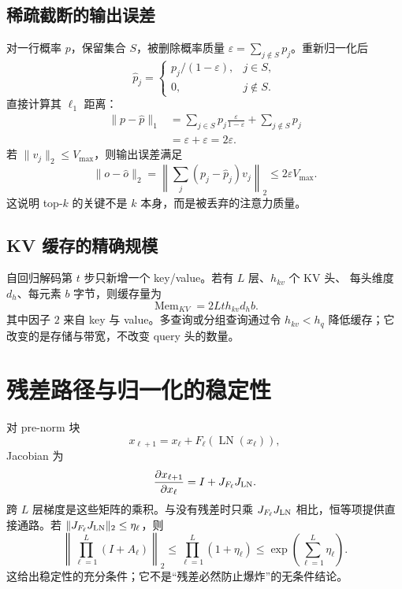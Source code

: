 \documentclass[11pt]{article}
\numberwithin{equation}{section}
\newcommand{\1}{\mathbf{1}}
\begin{document}
\subsection{稀疏截断的输出误差}

对一行概率 $p$，保留集合 $S$，被删除概率质量
$\varepsilon=\sum_{j\notin S}p_j$。重新归一化后
\begin{equation}
 \widehat p_j=
 \begin{cases}
 p_j/(1-\varepsilon),&j\in S,\\
 0,&j\notin S.
 \end{cases}
\end{equation}
直接计算其 $\ell_1$ 距离：
\begin{align}
 \|p-\widehat p\|_1
 &=\sum_{j\in S}p_j\frac{\varepsilon}{1-\varepsilon}
   +\sum_{j\notin S}p_j\\
 &=\varepsilon+\varepsilon=2\varepsilon.
\end{align}
若 $\|v_j\|_2\le V_{\max}$，则输出误差满足
\begin{equation}
 \|o-\widehat o\|_2
 =\left\|\sum_j(p_j-\widehat p_j)v_j\right\|_2
 \le 2\varepsilon V_{\max}.
\end{equation}
这说明 top-$k$ 的关键不是 $k$ 本身，而是被丢弃的注意力质量。

\subsection{KV 缓存的精确规模}

自回归解码第 $t$ 步只新增一个 key/value。若有 $L$ 层、$h_{kv}$ 个 KV 头、
每头维度 $d_h$、每元素 $b$ 字节，则缓存量为
\begin{equation}
 \operatorname{Mem}_{KV}=2Lth_{kv}d_hb.
\end{equation}
其中因子 $2$ 来自 key 与 value。多查询或分组查询通过令
$h_{kv}<h_q$ 降低缓存；它改变的是存储与带宽，不改变 query 头的数量。

\section{残差路径与归一化的稳定性}

对 pre-norm 块
\begin{equation}
 x_{\ell+1}=x_\ell+F_\ell(\operatorname{LN}(x_\ell)),
\end{equation}
Jacobian 为
\begin{equation}
 \frac{\partial x_{\ell+1}}{\partial x_\ell}
 =I+J_{F_\ell}J_{\rm LN}.
\end{equation}
跨 $L$ 层梯度是这些矩阵的乘积。与没有残差时只乘
$J_{F_\ell}J_{\rm LN}$ 相比，恒等项提供直接通路。若
$\|J_{F_\ell}J_{\rm LN}\|_2\le\eta_\ell$，则
\begin{equation}
 \left\|\prod_{\ell=1}^{L}(I+A_\ell)\right\|_2
 \le\prod_{\ell=1}^{L}(1+\eta_\ell)
 \le\exp\!\left(\sum_{\ell=1}^{L}\eta_\ell\right).
\end{equation}
这给出稳定性的充分条件；它不是“残差必然防止爆炸”的无条件结论。
\end{document}
